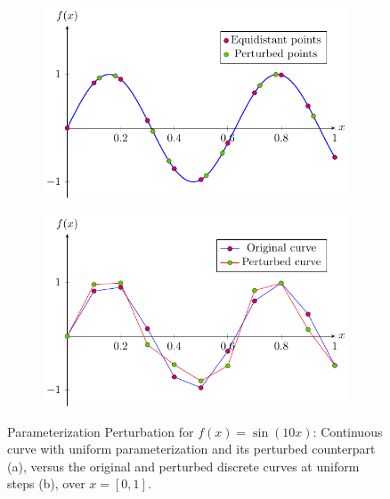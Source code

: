 \begin{figure}
    \centering
    \begin{subfigure}[b]{0.45\textwidth}
        \includegraphics[width=\textwidth]{figures/perturbation-parameterization-cont/fig.pdf}
        \caption{}
        \label{fig:perturbation-parameterization-cont}
    \end{subfigure}
    \hfill
    \begin{subfigure}[b]{0.45\textwidth}
        \includegraphics[width=\textwidth]{figures/perturbation-parameterization-disc/fig.pdf}
        \caption{}
        \label{fig:perturbation-parameterization-disc}
    \end{subfigure}
    \caption{Parameterization Perturbation for \( f(x) = \sin(10x) \): Continuous curve with uniform parameterization and its perturbed counterpart (a), versus the original and perturbed discrete curves at uniform steps (b), over \( x = [0, 1] \).}
    \label{fig:perturbation-parameterization}
\end{figure}


